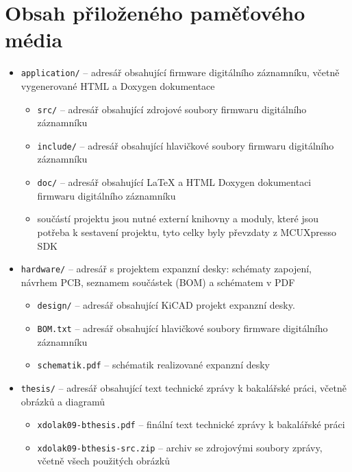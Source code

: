 
%

\chapter{Obsah přiloženého paměťového média}

\begin{itemize}
    \item \texttt{application/} -- adresář obsahující firmware digitálního záznamníku, včetně vygenerované HTML a Doxygen dokumentace
    \begin{itemize}
        \item \texttt{src/} -- adresář obsahující zdrojové soubory firmwaru digitálního záznamníku
        \item \texttt{include/} -- adresář obsahující hlavičkové soubory firmwaru digitálního záznamníku
        \item \texttt{doc/} -- adresář obsahující LaTeX a HTML Doxygen dokumentaci firmwaru digitálního záznamníku
        \item součástí projektu jsou nutné externí knihovny a moduly, které jsou potřeba k sestavení projektu, tyto celky byly převzdaty z MCUXpresso SDK
    \end{itemize}
    \item \texttt{hardware/} -- adresář s projektem expanzní desky: schématy zapojení, návrhem PCB, seznamem součástek (BOM) a schématem v PDF

    \begin{itemize}
        \item \texttt{design/} -- adresář obsahující KiCAD projekt expanzní desky.
        \item \texttt{BOM.txt} -- adresář obsahující hlavičkové soubory firmware digitálního záznamníku
        \item \texttt{schematik.pdf} -- schématik realizované expanzní desky
    \end{itemize}
    
    \item \texttt{thesis/} -- adresář obsahující text technické zprávy k bakalářské práci, včetně obrázků a diagramů

    \begin{itemize}
        \item \texttt{xdolak09-bthesis.pdf} -- finální text technické zprávy k bakalářské práci
        \item \texttt{xdolak09-bthesis-src.zip} -- archiv se zdrojovými soubory zprávy, včetně všech použitých obrázků
    \end{itemize}
    

\end{itemize}
